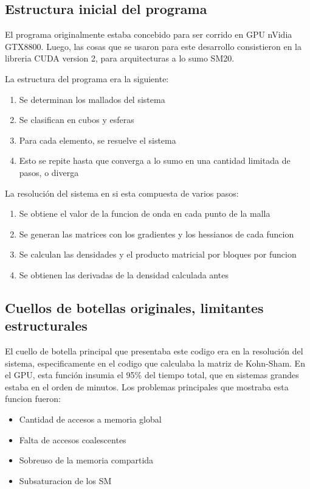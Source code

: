 
\subsection{Estructura inicial del programa}

El programa originalmente estaba concebido para ser corrido en GPU nVidia GTX8800.
Luego, las cosas que se usaron para este desarrollo consistieron en la libreria CUDA version
2, para arquitecturas a lo sumo SM20.

La estructura del programa era la siguiente:
\begin{enumerate}
\item Se determinan los mallados del sistema
\item Se clasifican en cubos y esferas
\item Para cada elemento, se resuelve el sistema
\item Esto se repite hasta que converga a lo sumo en una cantidad limitada de pasos, o diverga
\end{enumerate}

La resoluci\'on del sistema en si esta compuesta de varios pasos:
\begin{enumerate}
\item Se obtiene el valor de la funcion de onda en cada punto de la malla
\item Se generan las matrices con los gradientes y los hessianos de cada funcion
\item Se calculan las densidades y el producto matricial por bloques por funcion
\item Se obtienen las derivadas de la densidad calculada antes
\end{enumerate}


\subsection{Cuellos de botellas originales, limitantes estructurales}

El cuello de botella principal que presentaba este codigo era en la 
resoluci\'on del sistema, especificamente en el codigo que calculaba la matriz de Kohn-Sham.
En el GPU, esta funci\'on insumia el 95\% del tiempo total, que en sistemas grandes estaba
en el orden de minutos. Los problemas principales que mostraba esta funcion fueron:
\begin{itemize}
\item Cantidad de accesos a memoria global
\item Falta de accesos coalescentes
\item Sobreuso de la memoria compartida
\item Subsaturacion de los SM
\end{itemize}


